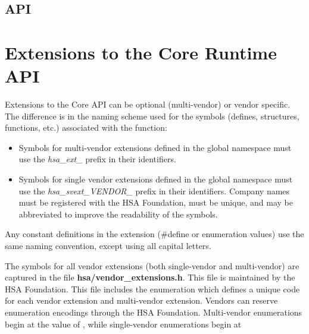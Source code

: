 \documentclass[final]{book}
\begin{document}
\subsection{API}



% 


\section{Extensions to the Core Runtime API}\label{extensions}

Extensions to the Core API can be optional (multi-vendor) or vendor
specific. The difference is in the naming scheme used for the symbols (defines,
structures, functions, etc.) associated with the function:

\begin{itemize}
\item Symbols for multi-vendor extensions defined in the global namespace must
  use the \emph{hsa_ext_} prefix in their identifiers.
\item Symbols for single vendor extensions defined in the global namespace must
  use the \emph{hsa_svext_VENDOR_} prefix in their identifiers. Company names
  must be registered with the HSA Foundation, must be unique, and may be
  abbreviated to improve the readability of the symbols.
\end{itemize}

Any constant definitions in the extension (\#define or enumeration values) use
the same naming convention, except using all capital letters.

The symbols for all vendor extensions (both single-vendor and multi-vendor) are
captured in the file {\bf hsa/vendor_extensions.h}. This file is maintained by
the HSA Foundation. This file includes the enumeration 
which defines a unique code for each vendor extension and multi-vendor
extension. Vendors can reserve enumeration encodings through the HSA
Foundation. Multi-vendor enumerations begin at the value of
, while single-vendor enumerations begin at
\end{document}
